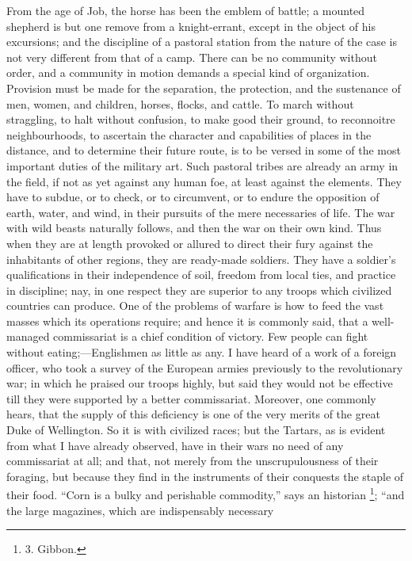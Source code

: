From the age of Job, the horse
has been the emblem of battle; a mounted shepherd is but one remove
from a knight-errant, except in the object of his excursions; and the
discipline of a pastoral station from the nature of the case is not
very different from that of a camp. There can be no community without
order, and a community in motion demands a special kind of
organization. Provision must be made for the separation, the
protection, and the sustenance of men, women, and children, horses,
flocks, and cattle. To march without straggling, to halt without
confusion, to make good their ground, to reconnoitre neighbourhoods,
to ascertain the character and capabilities of places in the distance,
and to determine their future route, is to be versed in some of the
most important duties of the military art. Such pastoral tribes are
already an army in the field, if not as yet against any human foe, at
least against the elements. They have to subdue, or to check, or to
circumvent, or to endure the opposition of earth, water, and wind, in
their pursuits of the mere necessaries of life. The war with wild
beasts naturally follows, and then the war on their own kind. Thus
when they are at length provoked or allured to direct their fury
against the inhabitants of other regions, they are ready-made
soldiers. They have a soldier's qualifications in their independence
of soil, freedom from local ties, and practice in discipline; nay, in
one respect they are superior to any troops which civilized countries
can produce. One of the problems of warfare is how to feed the vast
masses which its operations require; and hence it is commonly said,
that a well-managed commissariat is a chief condition of victory. Few
people can fight without eating;—Englishmen as little as any. I have
heard of a work of a foreign officer, who took a survey of the
European armies previously to the revolutionary war; in which he
praised our troops highly, but said they would not be effective till
they were supported by a better commissariat. Moreover, one commonly
hears, that the supply of this deficiency is one of the very merits of
the great Duke of Wellington. So it is with civilized races; but the
Tartars, as is evident from what I have already observed, have in
their wars no need of any commissariat at all; and that, not merely
from the unscrupulousness of their foraging, but because they find in
the instruments of their conquests the staple of their food. ``Corn is
a bulky and perishable commodity,'' says an historian \footnote{3.
Gibbon.}; ``and the large magazines, which are indispensably necessary
